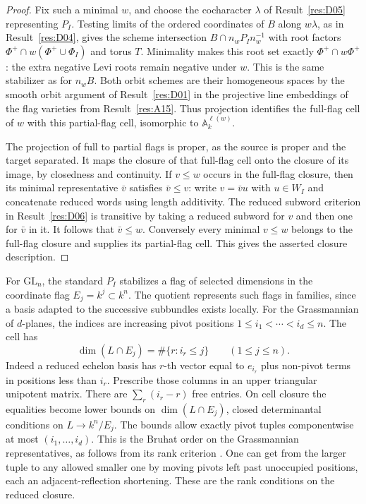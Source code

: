 \documentclass[11pt,a4paper,openany,oneside]{book}
\theoremstyle{resultstyle}
\theoremstyle{definition}
\numberwithin{equation}{chapter}
\newcommand{\GL}{\mathrm{GL}}
\begin{document}
\begin{proof}
Fix such a minimal \(w\), and choose the cocharacter
\(\lambda\) of Result~\ref{res:D05} representing \(P_I\).
Testing limits of the ordered coordinates of \(B\) along
\(w\lambda\), as in Result~\ref{res:D04}, gives the scheme
intersection \(B\cap n_wP_In_w^{-1}\) with root factors
\(\Phi^+\cap w(\Phi^+\cup\Phi_I)\) and torus \(T\).
Minimality makes this root set exactly
\(\Phi^+\cap w\Phi^+\): the extra negative Levi roots
remain negative under \(w\). This is the same stabilizer
as for \(n_wB\). Both orbit schemes are their homogeneous
spaces by the smooth orbit argument of Result~\ref{res:D01}
in the projective line embeddings of the flag varieties
from Result~\ref{res:A15}. Thus projection identifies the
full-flag cell of \(w\) with this partial-flag cell,
isomorphic to \(\mathbb A^{\ell(w)}_k\).

The projection of full to partial flags is proper,
as the source is proper and the target separated.
It maps the closure of that full-flag cell onto the
closure of its image, by closedness and continuity.
If \(v\le w\) occurs in the full-flag closure, then its
minimal representative \(\bar v\) satisfies \(\bar v\le v\):
write \(v=\bar v u\) with \(u\in W_I\) and concatenate
reduced words using length additivity. The reduced
subword criterion in Result~\ref{res:D06} is transitive
by taking a reduced subword for \(v\) and then one for
\(\bar v\) in it. It follows that \(\bar v\le w\).
Conversely every minimal \(v\le w\) belongs to the full-flag
closure and supplies its partial-flag cell. This gives the
asserted closure description.
\end{proof}

For \(\GL_n\), the standard \(P_I\) stabilizes a flag of selected dimensions in the coordinate flag \(E_j=k^j\subset k^n\). The quotient represents such flags in families, since a basis adapted to the successive subbundles exists locally. For the Grassmannian of \(d\)-planes, the indices are increasing pivot positions \(1\le i_1<\cdots<i_d\le n\). The cell has
\[
  \dim(L\cap E_j)=\#\{r:i_r\le j\}\qquad(1\le j\le n).
\]
Indeed a reduced echelon basis has \(r\)-th vector equal to \(e_{i_r}\) plus non-pivot terms in positions less than \(i_r\). Prescribe those columns in an upper triangular unipotent matrix. There are \(\sum_r(i_r-r)\) free entries. On cell closure the equalities become lower bounds on \(\dim(L\cap E_j)\), closed determinantal conditions on \(L\to k^n/E_j\). The bounds allow exactly pivot tuples componentwise at most \((i_1,\ldots,i_d)\). This is the Bruhat order on the Grassmannian representatives, as follows from its rank criterion \cite[Section 8.5]{springer}. One can get from the larger tuple to any allowed smaller one by moving pivots left past unoccupied positions, each an adjacent-reflection shortening. These are the rank conditions on the reduced closure.
\end{document}
